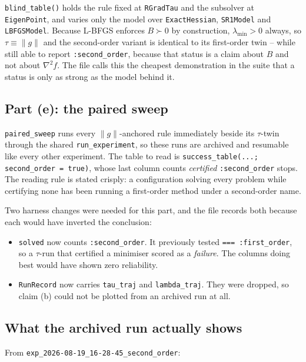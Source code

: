 \documentclass[11pt,a4paper]{article}
\newcommand{\jl}[1]{\texttt{\small #1}}
\newcommand{\file}[1]{\texttt{\small #1}}
\newcommand{\gnorm}{\lVert g\rVert}
\begin{document}
\jl{blind\_table()} holds the rule fixed at \jl{RGradTau} and the subsolver at
\jl{EigenPoint}, and varies only the model over \jl{ExactHessian}, \jl{SR1Model}
and \jl{LBFGSModel}. Because L-BFGS enforces $B \succ 0$ by construction,
$\lambda_{\min} > 0$ always, so $\tau \equiv \gnorm$ and the second-order variant
is identical to its first-order twin -- while still able to report
\jl{:second\_order}, because that status is a claim about $B$ and not about
$\nabla^2 f$. The file calls this the cheapest demonstration in the suite that a
status is only as strong as the model behind it.

\subsection{Part (e): the paired sweep}

\jl{paired\_sweep} runs every $\gnorm$-anchored rule immediately beside its
$\tau$-twin through the shared \jl{run\_experiment}, so these runs are archived and
resumable like every other experiment. The table to read is
\jl{success\_table(...; second\_order = true)}, whose last column counts
\emph{certified} \jl{:second\_order} stops. The reading rule is stated crisply: a
configuration solving every problem while certifying none has been running a
first-order method under a second-order name.

Two harness changes were needed for this part, and the file records both because
each would have inverted the conclusion:

\begin{itemize}[leftmargin=6mm,itemsep=2pt]
  \item \jl{solved} now counts \jl{:second\_order}. It previously tested
        \jl{=== :first\_order}, so a $\tau$-run that certified a minimiser scored as
        a \emph{failure}. The columns doing best would have shown zero reliability.
  \item \jl{RunRecord} now carries \jl{tau\_traj} and \jl{lambda\_traj}. They were
        dropped, so claim (b) could not be plotted from an archived run at all.
\end{itemize}

\subsection{What the archived run actually shows}

From \file{exp\_2026-08-19\_16-28-45\_second\_order}:
\end{document}
